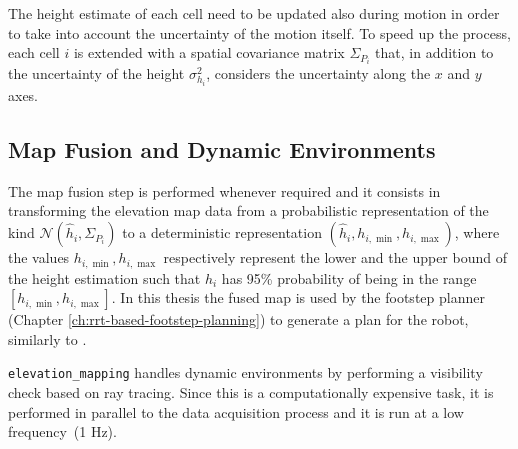 The height estimate of each cell need to be updated also during motion in 
order to take  
into account the uncertainty of the motion itself. To speed up the process,
each cell $i$ is extended with a spatial covariance matrix $\Sigma_{P_i}$ that,
in addition to the uncertainty of the height $\sigma_{h_i}^2$,
considers the uncertainty along the $x$ and $y$ axes.

\subsection{Map Fusion and Dynamic Environments}
The map fusion step is performed whenever required and it consists in 
transforming the elevation map data from a probabilistic representation of the 
kind $\mathcal{N}(\hat{h}_i, \Sigma_{P_i})$ to a deterministic representation 
$(\hat{h}_i, h_{i,\min}, h_{i,\max})$, where the values $h_{i,\min}, h_{i,\max}$
respectively represent the lower and the upper bound of the height estimation 
such that $h_i$ has 95\% probability of being in the range $[h_{i,\min},
h_{i,\max}]$. In this thesis the fused map is used by the footstep planner 
(Chapter \ref{ch:rrt-based-footstep-planning}) to generate a plan for the robot,
similarly to \cite{Fankauser2018RobustRoughTerrainLocomotion}.

\texttt{elevation\_mapping} handles dynamic environments by performing a 
visibility check based on ray tracing. Since this is a computationally 
expensive task, it is performed in parallel to the data acquisition process and 
it is run at a low frequency~(1 Hz).

